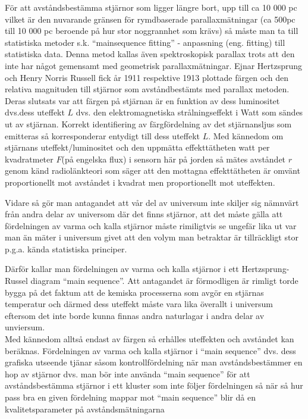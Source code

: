 \documentclass[./exercises.tex]{subfiles}
\begin{document}
För att avståndsbestämma stjärnor som ligger längre bort, upp till ca 10 000 pc vilket är den nuvarande gränsen
för rymdbaserade parallaxmätningar (ca 500pc till 10 000 pc beroende på hur stor noggrannhet som krävs) så måste man
ta till statistiska metoder s.k. ``mainsequence fitting'' - anpassning (eng. fitting) till statistiska data.
Denna metod kallas även spektroskopisk parallax trots att den inte har något gemensamt med geometrisk parallaxmätningar.
Ejnar Hertzsprung och Henry Norris Russell fick år 1911 respektive 1913  plottade färgen och den relativa
magnituden till stjärnor som avståndbestämts med parallax metoden. Deras slutsats var att
färgen på stjärnan är en funktion av dess luminositet dvs.dess uteffekt $L$ dvs. den elektromagnetiska strålningseffekt i Watt som
sändes ut av stjärnan.
Korrekt identifiering av färgfördelning av det stjärnansljus som emitteras så korresponderar entydigt till dess uteffekt $L$.
Med kännedom om stjärnans uteffekt/luminositet och den uppmätta effekttätheten watt per kvadratmeter
$F$(på engelska flux) i sensorn här på jorden så mätes avståndet $r$ genom känd radiolänkteori som säger att
den mottagna effekttätheten är omvänt proportionellt mot avståndet i kvadrat men proportionellt mot uteffekten.

Vidare så gör man antagandet att vår del av universum inte skiljer sig nämnvärt från andra delar av 
universom där det finns stjärnor, att det måste gälla att fördelningen av varma och kalla stjärnor måste rimiligtvis 
se ungefär lika ut var man än mäter i universum givet att den volym man betraktar är tillräckligt stor p.g.a. kända statistiska principer.

Därför kallar man fördelningen av varma och kalla stjärnor i ett Hertzsprung-Russel diagram
 ``main sequence''. Att antagandet är förmodligen är rimligt torde bygga på det faktum att de kemiska processerna 
som avgör en stjärnas temperatur och därmed dess uteffekt måste vara lika överallt i universum eftersom det inte borde kunna finnas
andra naturlagar i andra delar av unviersum.\\

Med kännedom alltså endast av färgen så erhålles uteffekten och avståndet kan beräknas. Fördelningen av varma och kalla stjärnor i ``main sequence''
dvs. dess grafiska utseende tjänar såsom kontrollfördelning när man avståndsbestämmer en hop av stjärnor dvs. man
bör inte använda  ``main sequence'' för att avståndsbestämma stjärnor i ett kluster som inte följer fördelningen
så när så hur pass bra en given fördelning mappar mot ``main sequence'' blir då en kvalitetsparameter på
avståndsmätningarna\\ 
\end{document}
